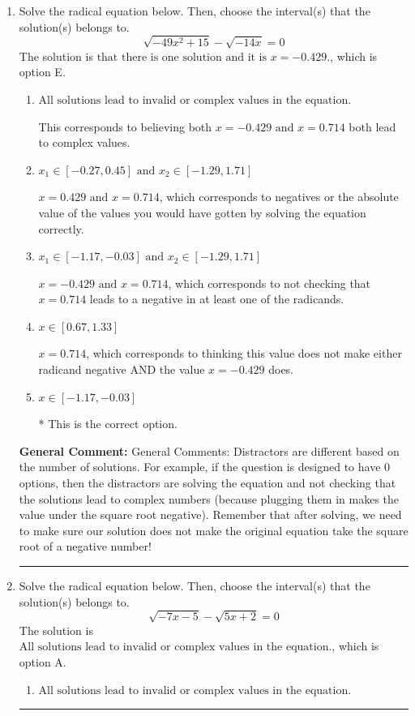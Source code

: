 \documentclass{extbook}[14pt]
\newcommand{\litem}[1]{\item #1

\rule{\textwidth}{0.4pt}}
\begin{document}
\begin{enumerate}\litem{
Solve the radical equation below. Then, choose the interval(s) that the solution(s) belongs to.
\[ \sqrt{-49 x^2 + 15} - \sqrt{-14 x} = 0 \]
The solution is \( \text{that there is one solution and it is } x = -0.429. \), which is option E.\begin{enumerate}[label=\Alph*.]
\item \( \text{All solutions lead to invalid or complex values in the equation.} \)

This corresponds to believing both $x = -0.429 \text{ and } x = 0.714$ both lead to complex values.
\item \( x_1 \in [-0.27, 0.45] \text{ and } x_2 \in [-1.29,1.71] \)

$x = 0.429 \text{ and } x = 0.714$, which corresponds to negatives or the absolute value of the values you would have gotten by solving the equation correctly.
\item \( x_1 \in [-1.17, -0.03] \text{ and } x_2 \in [-1.29,1.71] \)

$x = -0.429 \text{ and } x = 0.714$, which corresponds to not checking that $x = 0.714$ leads to a negative in at least one of the radicands.
\item \( x \in [0.67,1.33] \)

$x = 0.714$, which corresponds to thinking this value does not make either radicand negative AND the value $x = -0.429$ does.
\item \( x \in [-1.17,-0.03] \)

* This is the correct option.
\end{enumerate}

\textbf{General Comment:} General Comments: Distractors are different based on the number of solutions. For example, if the question is designed to have 0 options, then the distractors are solving the equation and not checking that the solutions lead to complex numbers (because plugging them in makes the value under the square root negative). Remember that after solving, we need to make sure our solution does not make the original equation take the square root of a negative number!
}
\litem{
Solve the radical equation below. Then, choose the interval(s) that the solution(s) belongs to.
\[ \sqrt{-7 x - 5} - \sqrt{5 x + 2} = 0 \]
The solution is \( \text{All solutions lead to invalid or complex values in the equation.} \), which is option A.\begin{enumerate}[label=\Alph*.]
\item \( \text{All solutions lead to invalid or complex values in the equation.} \)


\end{enumerate}}
\end{enumerate}
\end{document}
